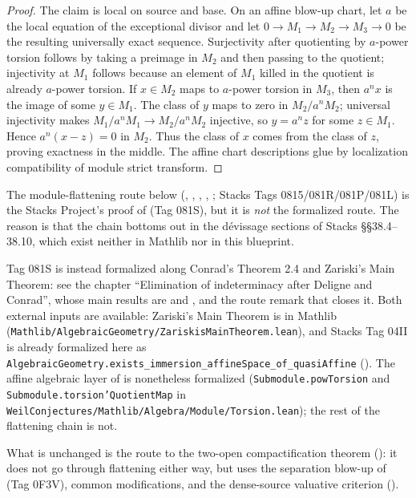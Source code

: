 \begin{proof}
  The claim is local on source and base.  On an affine blow-up chart, let $a$
  be the local equation of the exceptional divisor and let
  $0\to M_1\to M_2\to M_3\to0$ be the resulting universally exact sequence.
  Surjectivity after quotienting by $a$-power torsion follows by taking a
  preimage in $M_2$ and then passing to the quotient; injectivity at $M_1$
  follows because an element of $M_1$ killed in the quotient is already
  $a$-power torsion.  If $x\in M_2$ maps to $a$-power torsion in $M_3$,
  then $a^nx$ is the image of some $y\in M_1$.  The class of $y$ maps to zero
  in $M_2/a^nM_2$; universal injectivity makes
  $M_1/a^nM_1\to M_2/a^nM_2$ injective, so $y=a^nz$ for some $z\in M_1$.
  Hence $a^n(x-z)=0$ in $M_2$.  Thus the class of $x$ comes from the class of
  $z$, proving exactness in the middle.  The affine chart descriptions glue
  by localization compatibility of module strict transform.
\end{proof}

\begin{remark}
  The module-flattening route below
  (,
  ,
  ,
  ,
  ; Stacks Tags
  0815/081R/081P/081L) is the Stacks Project's proof of
   (Tag 081S), but it is
  \emph{not} the formalized route.  The reason is that the chain bottoms out
  in the d\'evissage sections of Stacks \S\S38.4--38.10, which exist neither
  in Mathlib nor in this blueprint.

  Tag 081S is instead formalized along Conrad's Theorem 2.4 and Zariski's Main
  Theorem: see the chapter ``Elimination of indeterminacy after Deligne and
  Conrad'', whose main results are
   and
  , and the route remark that
  closes it.  Both external inputs are available: Zariski's Main Theorem is in
  Mathlib (\texttt{Mathlib/AlgebraicGeometry/ZariskisMainTheorem.lean}), and
  Stacks Tag 04II is already formalized here as
  \texttt{AlgebraicGeometry.exists\_immersion\_affineSpace\_of\_quasiAffine}
  ().  The
  affine algebraic layer of
   is nonetheless formalized
  (\texttt{Submodule.powTorsion} and \texttt{Submodule.torsion'QuotientMap} in
  \texttt{WeilConjectures/Mathlib/Algebra/Module/Torsion.lean}); the rest of
  the flattening chain is not.

  What is unchanged is the route to the two-open compactification theorem
  (): it does not go through flattening either way,
  but uses the separation blow-up of
  (Tag 0F3V), common modifications, and the dense-source valuative criterion
  ().
\end{remark}

